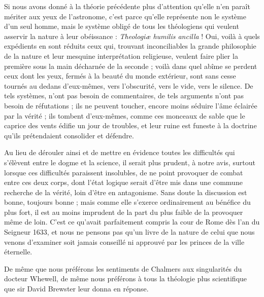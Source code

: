\documentclass[a4paper, 11pt, oneside, landscape]{article}
\begin{document}
Si nous avons donné à la théorie précédente plus d'attention qu'elle n'en paraît mériter aux yeux de l'astronome, c'est parce qu'elle représente non le système d'un seul homme, mais le système obligé de tous les théologiens qui veulent asservir la nature à leur obéissance : \emph{Theologiæ humilis ancilla} ! Oui, voilà à quels expédients en sont réduits ceux qui, trouvant inconciliables la grande philosophie de la nature et leur mesquine interprétation religieuse, veulent faire plier la première sous la main décharnée de la seconde ; voilà dans quel abîme se perdent ceux dont les yeux, fermés à la beauté du monde extérieur, sont sans cesse tournés au dedans d'eux-mêmes, vers l'obscurité, vers le vide, vers le silence. De tels systèmes, n'ont pas besoin de commentaires, de tels arguments n'ont pas besoin de réfutations ; ils ne peuvent toucher, encore moins séduire l'âme éclairée par la vérité ; ils tombent d'eux-mêmes, comme ces monceaux de sable que le caprice des vents édifie un jour de troubles, et leur ruine est funeste à la doctrine qu'ils prétendaient consolider et défendre.

Au lieu de dérouler ainsi et de mettre en évidence toutes les difficultés qui s'élèvent entre le dogme et la science, il serait plus prudent, à notre avis, surtout lorsque ces difficultés paraissent insolubles, de ne point provoquer de combat entre ces deux corps, dont l'état logique serait d'être mis dans une commune recherche de la vérité, loin d'être en antagonisme. Sans doute la discussion est bonne, toujours bonne ; mais comme elle s'exerce ordinairement au bénéfice du plus fort, il est au moins imprudent de la part du plus faible de la provoquer même de loin. C'est ce qu'avait parfaitement compris la cour de Rome dès l'an du Seigneur 1633, et nous ne pensons pas qu'un livre de la nature de celui que nous venons d'examiner soit jamais conseillé ni approuvé par les princes de la ville éternelle.

De même que nous préférons les sentiments de Chalmers aux singularités du docteur Whewell, de même nous préférons à tous la théologie plus scientifique que sir David Brewster leur donna en réponse.
\end{document}
